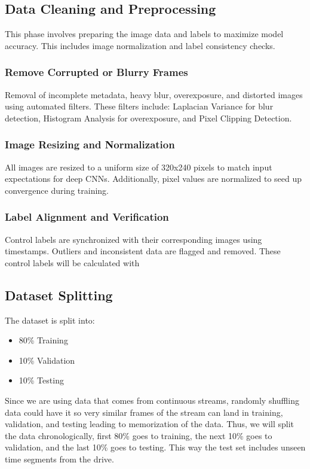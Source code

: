 \documentclass{article} %
\begin{document}
\subsection{Data Cleaning and Preprocessing}

This phase involves preparing the image data and labels to maximize model accuracy. 
This includes image normalization and label consistency checks.

\subsubsection{Remove Corrupted or Blurry Frames}
Removal of incomplete metadata, heavy blur, overexposure, and distorted images using automated filters.
These filters include: Laplacian Variance for blur detection, Histogram Analysis for overexposure, 
and Pixel Clipping Detection.


\subsubsection{Image Resizing and Normalization}
All images are resized to a uniform size of 320x240 pixels to match input expectations for deep CNNs. Additionally, 
pixel values are normalized to seed up convergence during training.

\subsubsection{Label Alignment and Verification}
Control labels are synchronized with their corresponding images using timestamps. Outliers and inconsistent 
data are flagged and removed. These control labels will be calculated with 

\subsection{Dataset Splitting}
The dataset is split into:
\begin{itemize}
  \item 80\% Training
  \item 10\% Validation 
  \item 10\% Testing 
\end{itemize}

Since we are using data that comes from continuous streams, randomly shuffling data could have
it so very similar frames of the stream can land in training, validation, and testing leading to 
memorization of the data. Thus, we will split the data chronologically, first 80\% goes to 
training, the next 10\% goes to validation, and the last 10\% goes to testing. This way the test set 
includes unseen time segments from the drive. 
\end{document}
